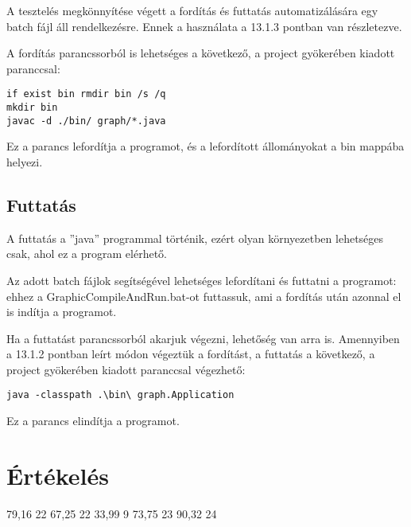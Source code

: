 A tesztelés megkönnyítése végett a fordítás és futtatás automatizálására egy batch fájl áll rendelkezésre. Ennek a használata a 13.1.3 pontban van részletezve. 

A fordítás parancssorból is lehetséges a következő, a project gyökerében kiadott paranccsal:

\begin{lstlisting}
if exist bin rmdir bin /s /q
mkdir bin
javac -d ./bin/ graph/*.java
\end{lstlisting}

Ez a parancs lefordítja a programot, és a lefordított állományokat a bin mappába helyezi.  



\subsection{Futtatás}

A futtatás a ''java'' programmal történik, ezért olyan környezetben lehetséges csak, ahol ez a program elérhető. 

Az adott batch fájlok segítségével lehetséges lefordítani és futtatni a programot: ehhez a GraphicCompileAndRun.bat-ot futtassuk, ami a fordítás után azonnal el is indítja a programot.

Ha a futtatást parancssorból akarjuk végezni, lehetőség van arra is. Amennyiben a 13.1.2 pontban leírt módon végeztük a fordítást, a futtatás a következő, a project gyökerében kiadott paranccsal végezhető:

\begin{lstlisting}
java -classpath .\bin\ graph.Application
\end{lstlisting}
Ez a parancs elindítja a programot.

\section{Értékelés}

\begin{ertekelesplusz}
{79,16} %
{22}        %
{67,25}
{22}
{33,99}
{9}
{73,75}
{23}
{90,32}
{24}

\end{ertekelesplusz}
